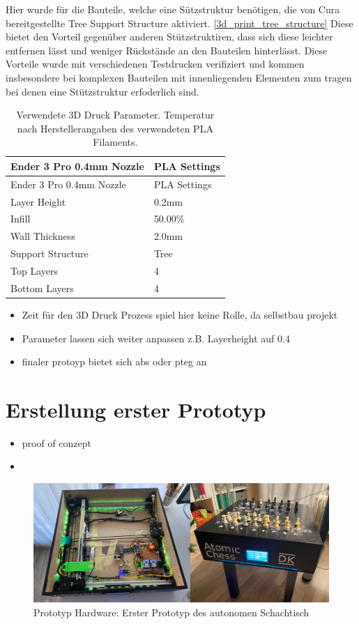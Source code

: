 Hier wurde für die Bauteile, welche eine Sützstruktur benötigen, die von
Cura bereitgestellte Tree Support Structure aktiviert.
\ref{3d_print_tree_structure} Diese bietet den Vorteil gegenüber anderen
Stützstruktiren, dass sich diese leichter entfernen lässt und weniger
Rückstände an den Bauteilen hinterlässt. Diese Vorteile wurde mit
verschiedenen Testdrucken verifiziert und kommen insbesondere bei
komplexen Bauteilen mit innenliegenden Elementen zum tragen bei denen
eine Stützstruktur erfoderlich sind.

\begin{longtable}[]{@{}ll@{}}
\caption{Verwendete 3D Druck Parameter. Temperatur nach
Herstellerangaben des verwendeten PLA Filaments.}\tabularnewline
\toprule
Ender 3 Pro 0.4mm Nozzle & PLA Settings\tabularnewline
\midrule
\endfirsthead
\toprule
Ender 3 Pro 0.4mm Nozzle & PLA Settings\tabularnewline
\midrule
\endhead
Layer Height & 0.2mm\tabularnewline
Infill & 50.00\%\tabularnewline
Wall Thickness & 2.0mm\tabularnewline
Support Structure & Tree\tabularnewline
Top Layers & 4\tabularnewline
Bottom Layers & 4\tabularnewline
\bottomrule
\end{longtable}

\begin{itemize}
\tightlist
\item
  Zeit für den 3D Druck Prozess spiel hier keine Rolle, da selbstbau
  projekt
\item
  Parameter lassen sich weiter anpassen z.B. Layerheight auf 0.4
\item
  finaler protoyp bietet sich abs oder pteg an
\end{itemize}

\hypertarget{erstellung-erster-prototyp}{%
\section{Erstellung erster Prototyp}\label{erstellung-erster-prototyp}}

\begin{itemize}
\item
  proof of conzept
\item
\end{itemize}

\begin{figure}
\centering
\includegraphics{images/table_images/dk.png}
\caption{Prototyp Hardware: Erster Prototyp des autonomen Schachtisch
\label{dk}}
\end{figure}

